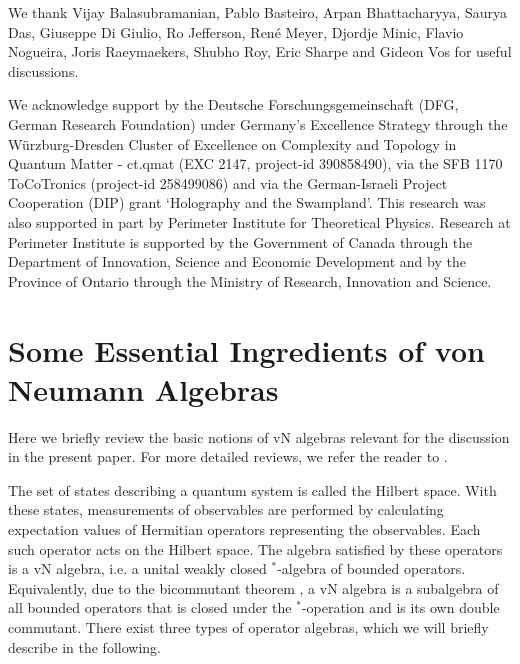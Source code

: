 \documentclass[a4paper,11pt]{article}
\newcommand{\1}{\mathds{1}}
\begin{document}
\acknowledgments

We thank Vijay Balasubramanian, Pablo Basteiro, Arpan Bhattacharyya, Saurya Das, Giuseppe Di Giulio, Ro Jefferson, René Meyer, Djordje Minic, Flavio Nogueira, Joris Raeymaekers, Shubho Roy, Eric Sharpe and Gideon Vos for useful discussions.

We acknowledge support by the Deutsche Forschungsgemeinschaft (DFG, German Research Foundation) under Germany's Excellence Strategy through the Würzburg-Dresden Cluster of Excellence on Complexity and Topology in Quantum Matter - ct.qmat (EXC 2147, project-id 390858490), via the SFB 1170 ToCoTronics (project-id 258499086) and via the  German-Israeli Project Cooperation (DIP) grant `Holography and the Swampland'. This research was also supported in part by Perimeter Institute for Theoretical Physics. Research at Perimeter Institute is supported by the Government of Canada through the Department of Innovation, Science and Economic Development and by the Province of Ontario through the Ministry of Research, Innovation and Science.

\appendix

\section{Some Essential Ingredients of von Neumann Algebras}
\label{app:EssentialAspectsvNAlgebras}

Here we briefly review the basic notions of vN algebras relevant for the discussion in the present paper. For more detailed reviews, we refer the reader to \cite{Witten:2018zxz,Witten:2021jzq,Sorce:2023fdx}.

The set of states describing a quantum system is called the Hilbert space. With these states, measurements of observables are performed by calculating expectation values of Hermitian operators representing the observables. Each such operator acts on the Hilbert space. The algebra satisfied by these operators is a vN algebra, i.e. a unital weakly closed $^\ast$-algebra of bounded operators. Equivalently, due to the bicommutant theorem \cite{vonNeumann1930algebra}, a vN algebra is a subalgebra of all bounded operators that is closed under the $^\ast$-operation and is its own double commutant. There exist three types of operator algebras, which we will briefly describe in the following.
\end{document}
